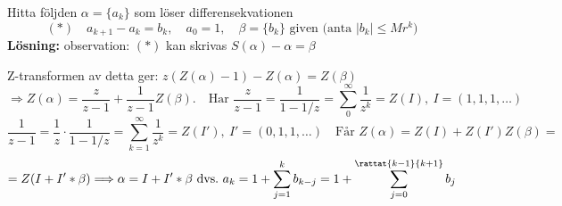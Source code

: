 \begin{example}
Hitta följden $\alpha = \{a_k\}$ som löser differensekvationen
\[ (*) \quad a_{k+1} - a_k = b_k, \quad a_0 = 1, \quad \beta = \{b_k\} \text{ given (anta } |b_k| \le Mr^k) \]
\textbf{Lösning:} observation: $(*)$ kan skrivas $S(\alpha) - \alpha = \beta$

Z-transformen av detta ger: $z(Z(\alpha) - 1) - Z(\alpha) = Z(\beta)$
\[ \Rightarrow Z(\alpha) = \frac{z}{z - 1} + \frac{1}{z - 1}Z(\beta). \quad \text{Har } \frac{z}{z - 1} = \frac{1}{1 - 1/z} = \sum_0^\infty \frac{1}{z^k} = Z(I), \ I = (1, 1, 1, \dots) \]
\[ \frac{1}{z - 1} = \frac{1}{z} \cdot \frac{1}{1 - 1/z} = \sum_{k = 1}^\infty \frac{1}{z^k} = Z(I'),\ I' = (0, 1, 1, \dots) \quad \text{Får } Z(\alpha) = Z(I) + Z(I')Z(\beta) = \]
\[ = Z(I + I' * \beta) \Longrightarrow \alpha = I + I' * \beta \text{ dvs.\ } a_k = 1 + \sum_{j = 1}^k b_{k-j} = 1 + \sum_{j = 0}^{\rattat{k - 1}{k + 1}} b_j \]
\end{example}
